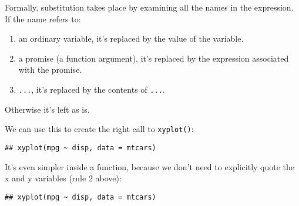 Formally, substitution takes place by examining all the names in the
expression. If the name refers to:

\begin{enumerate}
\def\labelenumi{\arabic{enumi}.}
\item
  an ordinary variable, it's replaced by the value of the variable.
\item
  a promise (a function argument), it's replaced by the expression
  associated with the promise.
\item
  \texttt{...}, it's replaced by the contents of \texttt{...}.
\end{enumerate}

Otherwise it's left as is.

We can use this to create the right call to \texttt{xyplot()}:

\begin{Shaded}
\begin{Highlighting}[]
\StringTok{ }
\StringTok{ }
\NormalTok{(}\OperatorTok{~}\StringTok{ }
\end{Highlighting}
\end{Shaded}

\begin{verbatim}
## xyplot(mpg ~ disp, data = mtcars)
\end{verbatim}

It's even simpler inside a function, because we don't need to explicitly
quote the x and y variables (rule 2 above):

\begin{Shaded}
\begin{Highlighting}[]
\StringTok{ }
  \NormalTok{(}\OperatorTok{~}\StringTok{ }
\NormalTok{\}}
\end{Highlighting}
\end{Shaded}

\begin{verbatim}
## xyplot(mpg ~ disp, data = mtcars)
\end{verbatim}


